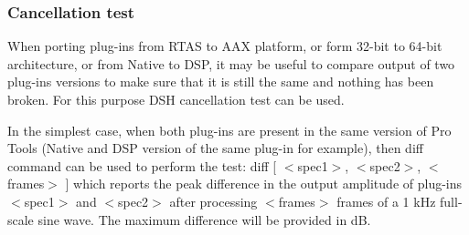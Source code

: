 \hypertarget{a00365_subsection__cancellationtest}{}\subsubsection{Cancellation test}\label{a00365_subsection__cancellationtest}
 When porting plug-\/ins from R\+T\+A\+S to A\+A\+X platform, or form 32-\/bit to 64-\/bit architecture, or from Native to D\+S\+P, it may be useful to compare output of two plug-\/in\textquotesingle{}s versions to make sure that it is still the same and nothing has been broken. For this purpose D\+S\+H cancellation test can be used.

In the simplest case, when both plug-\/ins are present in the same version of Pro Tools (Native and D\+S\+P version of the same plug-\/in for example), then {\ttfamily diff} command can be used to perform the test\+: {\ttfamily diff \mbox{[} $<$spec1$>$, $<$spec2$>$, $<$frames$>$ \mbox{]}} which reports the peak difference in the output amplitude of plug-\/ins $<$spec1$>$ and $<$spec2$>$ after processing $<$frames$>$ frames of a 1 k\+Hz full-\/scale sine wave. The maximum difference will be provided in d\+B.

